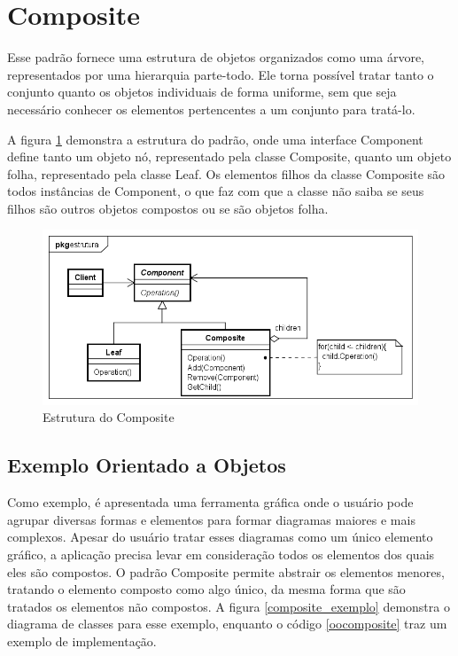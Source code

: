\section{Composite}

Esse padrão fornece uma estrutura de objetos 
organizados como uma árvore, representados 
por uma hierarquia parte-todo. 
Ele torna possível tratar tanto o conjunto 
quanto os objetos individuais de forma 
uniforme, sem que seja necessário conhecer 
os elementos pertencentes a um conjunto para 
tratá-lo.\cite{gamma:1995}

A figura \ref{composite_struct} demonstra a 
estrutura do padrão, onde uma interface Component 
define tanto um objeto nó, representado pela 
classe Composite, quanto um objeto folha, 
representado pela classe Leaf. Os elementos 
filhos da classe Composite são todos instâncias 
de Component, o que faz com que a classe não 
saiba se seus filhos são outros objetos compostos 
ou se são objetos folha.

\begin{figure}[htb]
	\caption{\label{composite_struct}Estrutura do Composite}
	\begin{center}
	    \includegraphics[scale=0.5]{5_padroes-contexto-funcional/5.2_estruturais/5.2.3_composite/composite_estrutura.png}
	\end{center}
\end{figure}

\subsection*{Exemplo Orientado a Objetos}

Como exemplo, é apresentada uma ferramenta gráfica 
onde o usuário pode agrupar diversas formas e 
elementos 
para formar diagramas maiores e mais complexos. 
Apesar do usuário tratar esses diagramas como um 
único elemento gráfico, a aplicação precisa levar 
em consideração todos os elementos dos quais eles 
são compostos. O padrão Composite permite 
abstrair os elementos menores, tratando o elemento 
composto como algo único, da mesma forma que 
são tratados os elementos não compostos. A figura 
\ref{composite_exemplo} demonstra o diagrama de 
classes para esse exemplo, enquanto o código 
\ref{oocomposite} traz um exemplo de implementação.

